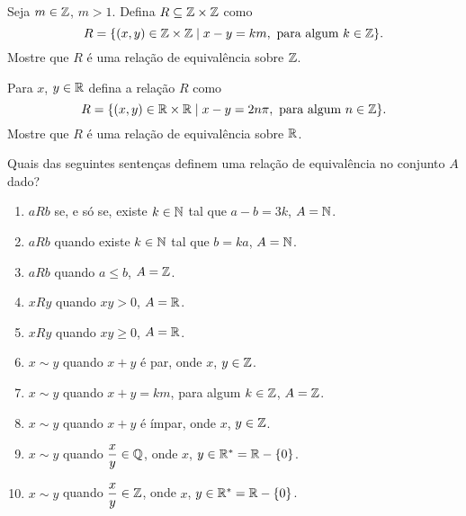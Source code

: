 \documentclass[12pt]{exam}
\begin{document}
    \vspace{.3cm}

    \questao{} Seja $m \in \mathbb{Z}$, $m > 1$. Defina $R \subseteq \mathbb{Z}\times\mathbb{Z}$ como
    \[
      R = \{(x,y) \in \mathbb{Z}\times\mathbb{Z} \mid x - y = km, \mbox{ para algum } k \in \mathbb{Z}\}.
    \]
    Mostre que $R$ é uma relação de equivalência sobre $\mathbb{Z}$.

    \vspace{.3cm}

    \questao{} Para $x$, $y \in \mathbb{R}$ defina a relação $R$ como
    \[
        R = \{(x,y) \in \mathbb{R} \times \mathbb{R} \mid x - y = 2n\pi, \mbox{ para algum } n \in \mathbb{Z}\}.
    \]
    Mostre que $R$ é uma relação de equivalência sobre $\mathbb{R}$.

    \vspace{.3cm}

    \questao{} Quais das seguintes sentenças definem uma relação de equivalência no conjunto $A$ dado?
    \begin{enumerate}[label={\alph*})]
        \item $aRb$ se, e s{\'o} se, existe $k \in \mathbb{N}$ tal que $a - b = 3k$, $A = \mathbb{N}$.

        \item $aRb$ quando existe $k \in \mathbb{N}$ tal que $b = k a$, $A = \mathbb{N}$.

        \item $aRb$ quando $a \le b$, $A = \mathbb{Z}$.

        \item $xRy$ quando $xy > 0$, $ A = \mathbb{R}$.

        \item $xRy$ quando $xy \ge 0$, $ A = \mathbb{R}$.

        \item $x \sim y$ quando $x + y$ é par, onde $x$, $y \in \mathbb{Z}$.

        \item $x \sim y$ quando  $x + y = km$, para algum $k \in \mathbb{Z}$, $A = \mathbb{Z}$.

        \item $x \sim y$ quando $x + y$ é ímpar, onde $x$, $y \in \mathbb{Z}$.

        \item $x \sim y$ quando $\dfrac{x}{y} \in \mathbb{Q}$, onde $x$, $y \in \mathbb{R}^* = \mathbb{R} - \{0\}$.

        \item $x \sim y$ quando $\dfrac{x}{y} \in \mathbb{Z}$, onde $x$, $y \in \mathbb{R}^* = \mathbb{R} - \{0\}$.
    \end{enumerate}
\end{document}
